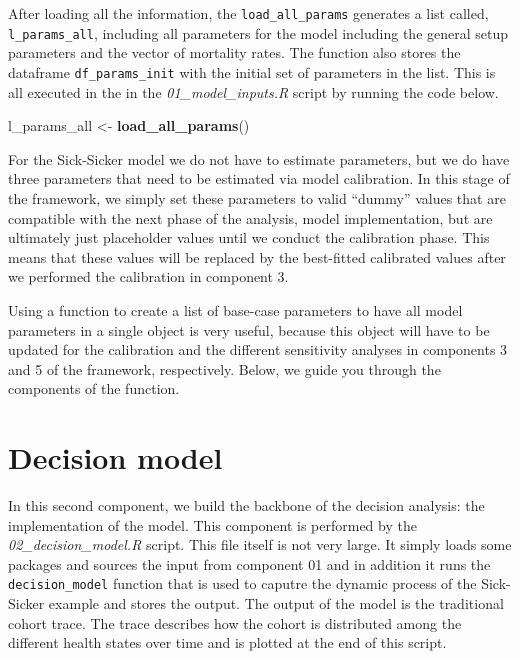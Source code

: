 \documentclass[]{book}
\newenvironment{Shaded}{\begin{snugshade}}{\end{snugshade}}
\newcommand{\KeywordTok}[1]{\textcolor[rgb]{0.13,0.29,0.53}{\textbf{#1}}}
\newcommand{\NormalTok}[1]{#1}
\newcommand{\StringTok}[1]{\textcolor[rgb]{0.31,0.60,0.02}{#1}}
\begin{document}
After loading all the information, the \texttt{load\_all\_params} generates a list called, \texttt{l\_params\_all}, including all parameters for the model including the general setup parameters and the vector of mortality rates. The function also stores the dataframe \texttt{df\_params\_init} with the initial set of parameters in the list. This is all executed in the in the \emph{01\_model\_inputs.R} script by running the code below.

\begin{Shaded}
\begin{Highlighting}[]
\NormalTok{l_params_all <-}\StringTok{ }\KeywordTok{load_all_params}\NormalTok{()}
\end{Highlighting}
\end{Shaded}

For the Sick-Sicker model we do not have to estimate parameters, but we do have three parameters that need to be estimated via model calibration. In this stage of the framework, we simply set these parameters to valid ``dummy'' values that are compatible with the next phase of the analysis, model implementation, but are ultimately just placeholder values until we conduct the calibration phase. This means that these values will be replaced by the best-fitted calibrated values after we performed the calibration in component 3.

Using a function to create a list of base-case parameters to have all model parameters in a single object is very useful, because this object will have to be updated for the calibration and the different sensitivity analyses in components 3 and 5 of the framework, respectively. Below, we guide you through the components of the function.

\hypertarget{simulation}{%
\chapter{Decision model}\label{simulation}}

In this second component, we build the backbone of the decision analysis: the implementation of the model. This component is performed by the \emph{02\_decision\_model.R} script. This file itself is not very large. It simply loads some packages and sources the input from component 01 and in addition it runs the \texttt{decision\_model} function that is used to caputre the dynamic process of the Sick-Sicker example and stores the output. The output of the model is the traditional cohort trace. The trace describes how the cohort is distributed among the different health states over time and is plotted at the end of this script.
\end{document}
